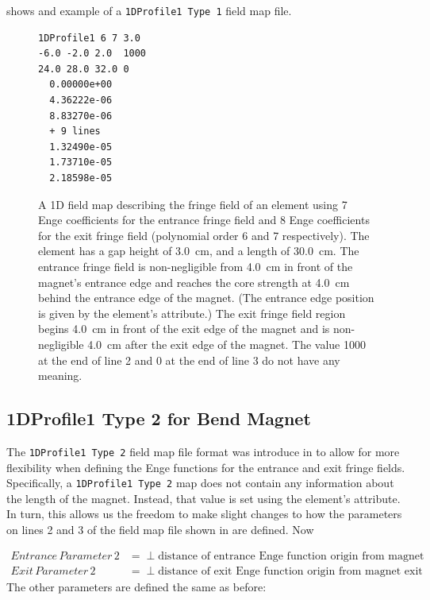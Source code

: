  shows and example of a \texttt{1DProfile1 Type 1} field map file.\\


\begin{figure}[h]
  \begin{fmpage}
\begin{verbatim}
1DProfile1 6 7 3.0
-6.0 -2.0 2.0  1000
24.0 28.0 32.0 0
  0.00000e+00
  4.36222e-06
  8.83270e-06
  + 9 lines
  1.32490e-05
  1.73710e-05
  2.18598e-05
\end{verbatim}
  \end{fmpage}
  \caption[Example of a 1DProfile1 Type 1 field map]{A 1D field map describing the fringe field of an element using
    7 Enge coefficients for the entrance fringe field and 8 Enge coefficients for the exit fringe field (polynomial
    order 6 and 7 respectively). The element has a gap height of \SI{3.0}{\centi\meter}, and a length of \SI{30.0}{\centi\meter}. The entrance
    fringe field is non-negligible from \SI{4.0}{\centi\meter} in front of the magnet's entrance edge and reaches the core strength
    at \SI{4.0}{\centi\meter} behind the entrance edge of the magnet. (The entrance edge position is given by the element's
     attribute.) The exit fringe field region begins \SI{4.0}{\centi\meter} in front of the exit edge of the magnet and is non-negligible \SI{4.0}{\centi\meter} after the exit edge of the magnet. The value 1000 at the end of line 2 and 0 at the end of line 3 do not have any meaning.}
  \label{fig:1DProfile1Type1}
\end{figure}

\clearpage

\subsection{1DProfile1 Type 2 for Bend Magnet}
\label{ssec:1DProfile1Type2}
The \texttt{1DProfile1 Type 2} field map file format was introduce in \opal {} to allow for more flexibility
when defining the Enge functions for the entrance and exit fringe fields. Specifically, a \texttt{1DProfile1 Type 2} map
does not contain any information about the length of the magnet. Instead, that value is set using the element's
 attribute. In turn, this allows us the freedom to make slight changes to how the parameters on lines 2
and 3 of the field map file shown in  are defined. Now

\begin{align*}
  Entrance\,Parameter\,2 &= \perp \text{distance of entrance Enge function origin from magnet entrance edge} \\
  Exit\,Parameter\,2 &= \perp \text{distance of exit Enge function origin from magnet exit edge}
\end{align*}
The other parameters are defined the same as before:

